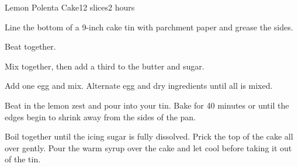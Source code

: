 \documentclass[../Cookbook.tex]{subfiles}
\begin{document}
\begin{recipe}[LemonPolentaCake]{Lemon Polenta Cake}{12 slices}{2 hours}

Line the bottom of a 9-inch cake tin with parchment paper and grease the sides.

    Beat together.

    Mix together, then add a third to the butter and sugar.

    Add one egg and mix.
    Alternate egg and dry ingredients until all is mixed.

    Beat in the lemon zest and pour into your tin.
    Bake for 40 minutes or until the edges begin to shrink away from the sides of the pan.

    Boil together until the icing sugar is fully dissolved.
    Prick the top of the cake all over gently.
    Pour the warm syrup over the cake and let cool before taking it out of the tin.

\end{recipe}
\end{document}
